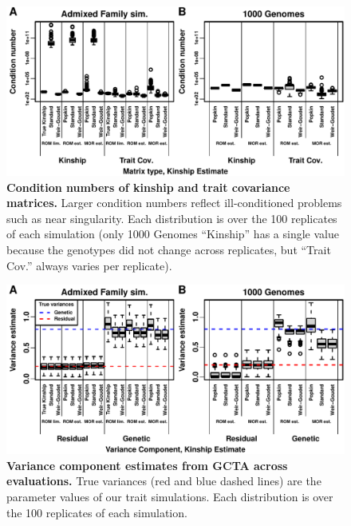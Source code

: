 \documentclass[11pt]{article}
\begin{document}
\begin{figure}[bp!]
  \centering
  \includegraphics[width=\textwidth]{kappa.pdf}
  \caption{
    {\bf Condition numbers of kinship and trait covariance matrices.}
    Larger condition numbers reflect ill-conditioned problems such as near singularity.
    Each distribution is over the 100 replicates of each simulation (only 1000 Genomes ``Kinship'' has a single value because the genotypes did not change across replicates, but ``Trait Cov.'' always varies per replicate).
  }
  \label{fig:kappa}
\end{figure}

\begin{figure}[bp!]
  \centering
  \includegraphics[width=\textwidth]{preds-reml-sigmas.pdf}
  \caption{
    {\bf Variance component estimates from GCTA across evaluations.}
    True variances (red and blue dashed lines) are the parameter values of our trait simulations.
    Each distribution is over the 100 replicates of each simulation.
  }
  \label{fig:preds-reml-sigmas}
\end{figure}
\end{document}
